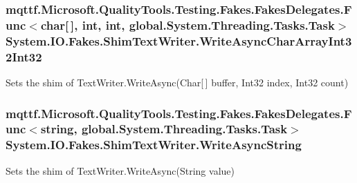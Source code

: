 \hypertarget{class_system_1_1_i_o_1_1_fakes_1_1_shim_text_writer_a3756e2dd03eabffb82887ebe1c0d1154}{
\subsubsection[{Write\-Async\-Char\-Array\-Int32\-Int32}]{\setlength{\rightskip}{0pt plus 5cm}mqttf.\-Microsoft.\-Quality\-Tools.\-Testing.\-Fakes.\-Fakes\-Delegates.\-Func$<$char\mbox{[}$\,$\mbox{]}, int, int, global.\-System.\-Threading.\-Tasks.\-Task$>$ System.\-I\-O.\-Fakes.\-Shim\-Text\-Writer.\-Write\-Async\-Char\-Array\-Int32\-Int32\hspace{0.3cm}{\ttfamily [set]}}}\label{class_system_1_1_i_o_1_1_fakes_1_1_shim_text_writer_a3756e2dd03eabffb82887ebe1c0d1154}


Sets the shim of Text\-Writer.\-Write\-Async(\-Char\mbox{[}$\,$\mbox{]} buffer, Int32 index, Int32 count)

\hypertarget{class_system_1_1_i_o_1_1_fakes_1_1_shim_text_writer_a0ff8dfed6093d426da57dc0c6fe72af9}{
\subsubsection[{Write\-Async\-String}]{\setlength{\rightskip}{0pt plus 5cm}mqttf.\-Microsoft.\-Quality\-Tools.\-Testing.\-Fakes.\-Fakes\-Delegates.\-Func$<$string, global.\-System.\-Threading.\-Tasks.\-Task$>$ System.\-I\-O.\-Fakes.\-Shim\-Text\-Writer.\-Write\-Async\-String\hspace{0.3cm}{\ttfamily [set]}}}\label{class_system_1_1_i_o_1_1_fakes_1_1_shim_text_writer_a0ff8dfed6093d426da57dc0c6fe72af9}


Sets the shim of Text\-Writer.\-Write\-Async(\-String value)

